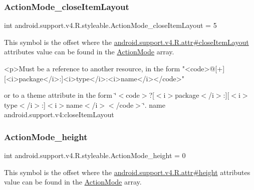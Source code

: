 \subsubsection{\texorpdfstring{Action\+Mode\+\_\+close\+Item\+Layout}{ActionMode\_closeItemLayout}}
{\footnotesize\ttfamily int android.\+support.\+v4.\+R.\+styleable.\+Action\+Mode\+\_\+close\+Item\+Layout = 5\hspace{0.3cm}{\ttfamily [static]}}

This symbol is the offset where the \hyperlink{classandroid_1_1support_1_1v4_1_1R_1_1attr_aceba222aab6eef55aba6d3ec6be64f78}{android.\+support.\+v4.\+R.\+attr\#close\+Item\+Layout} attribute\textquotesingle{}s value can be found in the \hyperlink{classandroid_1_1support_1_1v4_1_1R_1_1styleable_abc7d063172fa73270c0ab8e5f7093972}{Action\+Mode} array.

\begin{DoxyVerb}      <p>Must be a reference to another resource, in the form "<code>@[+][<i>package</i>:]<i>type</i>:<i>name</i></code>"
\end{DoxyVerb}
 or to a theme attribute in the form \char`\"{}$<$code$>$?\mbox{[}$<$i$>$package$<$/i$>$\+:\mbox{]}\mbox{[}$<$i$>$type$<$/i$>$\+:\mbox{]}$<$i$>$name$<$/i$>$$<$/code$>$\char`\"{}.  name android.\+support.\+v4\+:close\+Item\+Layout \mbox{\label{classandroid_1_1support_1_1v4_1_1R_1_1styleable_a4c33e09d0d28a0556eb95a6d8e79d430}} 
\subsubsection{\texorpdfstring{Action\+Mode\+\_\+height}{ActionMode\_height}}
{\footnotesize\ttfamily int android.\+support.\+v4.\+R.\+styleable.\+Action\+Mode\+\_\+height = 0\hspace{0.3cm}{\ttfamily [static]}}

This symbol is the offset where the \hyperlink{classandroid_1_1support_1_1v4_1_1R_1_1attr_a991d4e3217e3aec7fcb237693e406b04}{android.\+support.\+v4.\+R.\+attr\#height} attribute\textquotesingle{}s value can be found in the \hyperlink{classandroid_1_1support_1_1v4_1_1R_1_1styleable_abc7d063172fa73270c0ab8e5f7093972}{Action\+Mode} array.

